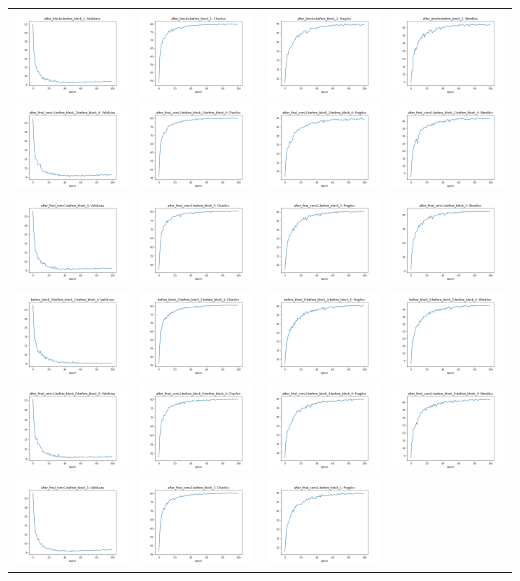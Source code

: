 \begin{longtable}{cccc}
\includegraphics[scale=0.2]{./images/mixup_position/after_blocks;before_block_1_ValidLoss.png} & \includegraphics[scale=0.2]{./images/mixup_position/after_blocks;before_block_1_CharAcc.png} & \includegraphics[scale=0.2]{./images/mixup_position/after_blocks;before_block_1_FragAcc.png} & \includegraphics[scale=0.2]{./images/mixup_position/after_blocks;before_block_1_WordAcc.png}\\
\includegraphics[scale=0.2]{./images/mixup_position/after_final_conv1;before_block_2;before_block_4_ValidLoss.png} & \includegraphics[scale=0.2]{./images/mixup_position/after_final_conv1;before_block_2;before_block_4_CharAcc.png} & \includegraphics[scale=0.2]{./images/mixup_position/after_final_conv1;before_block_2;before_block_4_FragAcc.png} & \includegraphics[scale=0.2]{./images/mixup_position/after_final_conv1;before_block_2;before_block_4_WordAcc.png}\\
\includegraphics[scale=0.2]{./images/mixup_position/after_final_conv1;before_block_3_ValidLoss.png} & \includegraphics[scale=0.2]{./images/mixup_position/after_final_conv1;before_block_3_CharAcc.png} & \includegraphics[scale=0.2]{./images/mixup_position/after_final_conv1;before_block_3_FragAcc.png} & \includegraphics[scale=0.2]{./images/mixup_position/after_final_conv1;before_block_3_WordAcc.png}\\
\includegraphics[scale=0.2]{./images/mixup_position/before_block_0;before_block_2;before_block_4_ValidLoss.png} & \includegraphics[scale=0.2]{./images/mixup_position/before_block_0;before_block_2;before_block_4_CharAcc.png} & \includegraphics[scale=0.2]{./images/mixup_position/before_block_0;before_block_2;before_block_4_FragAcc.png} & \includegraphics[scale=0.2]{./images/mixup_position/before_block_0;before_block_2;before_block_4_WordAcc.png}\\
\includegraphics[scale=0.2]{./images/mixup_position/after_final_conv1;before_block_0;before_block_4_ValidLoss.png} & \includegraphics[scale=0.2]{./images/mixup_position/after_final_conv1;before_block_0;before_block_4_CharAcc.png} & \includegraphics[scale=0.2]{./images/mixup_position/after_final_conv1;before_block_0;before_block_4_FragAcc.png} & \includegraphics[scale=0.2]{./images/mixup_position/after_final_conv1;before_block_0;before_block_4_WordAcc.png}\\
\includegraphics[scale=0.2]{./images/mixup_position/after_final_conv1;before_block_1_ValidLoss.png} & \includegraphics[scale=0.2]{./images/mixup_position/after_final_conv1;before_block_1_CharAcc.png} & \includegraphics[scale=0.2]{./images/mixup_position/after_final_conv1;before_block_1_FragAcc.png} & 
\end{longtable}
